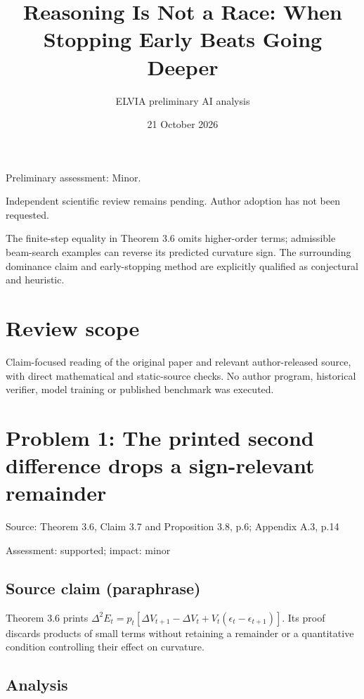 \documentclass[11pt]{article}
\begin{document}
\title{Reasoning Is Not a Race: When Stopping Early Beats Going Deeper}

\author{ELVIA preliminary AI analysis}\date{21 October 2026}\maketitle

Preliminary assessment: Minor.\par

Independent scientific review remains pending. Author adoption has not been requested.

The finite-step equality in Theorem 3.6 omits higher-order terms; admissible beam-search examples can reverse its predicted curvature sign. The surrounding dominance claim and early-stopping method are explicitly qualified as conjectural and heuristic.

\section*{Review scope}

Claim-focused reading of the original paper and relevant author-released source, with direct mathematical and static-source checks. No author program, historical verifier, model training or published benchmark was executed.

\section*{Problem 1: The printed second difference drops a sign-relevant remainder}

Source: Theorem 3.6, Claim 3.7 and Proposition 3.8, p.6; Appendix A.3, p.14

Assessment: supported; impact: minor

\subsection*{Source claim (paraphrase)}

Theorem 3.6 prints \(\Delta^2E_t=p_t[\Delta V_{t+1}-\Delta V_t+V_t(\epsilon_t-\epsilon_{t+1})]\). Its proof discards products of small terms without retaining a remainder or a quantitative condition controlling their effect on curvature.

\subsection*{Analysis}
\end{document}
